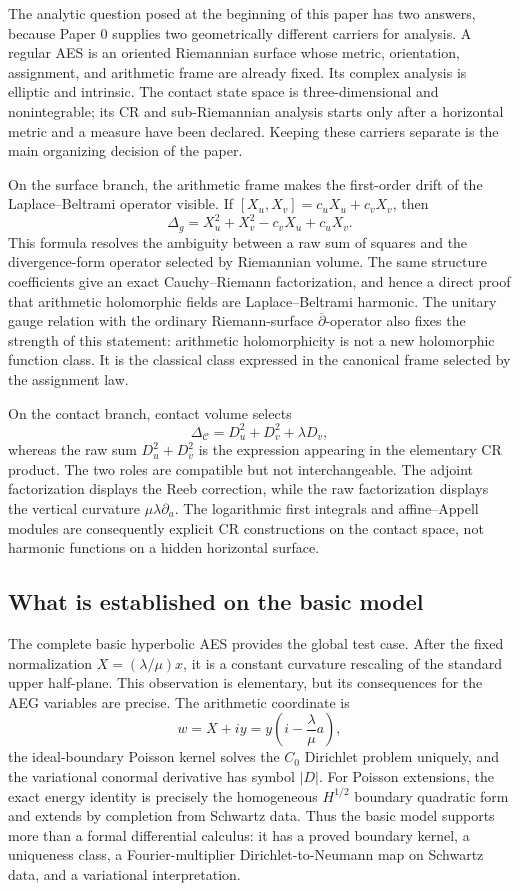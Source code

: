 The analytic question posed at the beginning of this paper has two answers, because
Paper 0 supplies two geometrically different carriers for analysis.  A regular AES
is an oriented Riemannian surface whose metric, orientation, assignment, and
arithmetic frame are already fixed.  Its complex analysis is elliptic and intrinsic.
The contact state space is three-dimensional and nonintegrable; its CR and
sub-Riemannian analysis starts only after a horizontal metric and a measure have
been declared.  Keeping these carriers separate is the main organizing decision of
the paper.

On the surface branch, the arithmetic frame makes the first-order drift of the
Laplace--Beltrami operator visible.  If
$[X_u,X_v]=c_uX_u+c_vX_v$, then
\[
 \Delta_g=X_u^2+X_v^2-c_vX_u+c_uX_v.
\]
This formula resolves the ambiguity between a raw sum of squares and the
divergence-form operator selected by Riemannian volume.  The same structure
coefficients give an exact Cauchy--Riemann factorization, and hence a direct proof
that arithmetic holomorphic fields are Laplace--Beltrami harmonic.  The unitary
gauge relation with the ordinary Riemann-surface $\overline\partial$-operator also
fixes the strength of this statement: arithmetic holomorphicity is not a new
holomorphic function class.  It is the classical class expressed in the canonical
frame selected by the assignment law.

On the contact branch, contact volume selects
\[
 \Delta_{\mathcal C}=D_u^2+D_v^2+\lambda D_v,
\]
whereas the raw sum $D_u^2+D_v^2$ is the expression appearing in the elementary
CR product.  The two roles are compatible but not interchangeable.  The adjoint
factorization displays the Reeb correction, while the raw factorization displays
the vertical curvature $\mu\lambda\partial_a$.  The logarithmic first integrals
and affine--Appell modules are consequently explicit CR constructions on the
contact space, not harmonic functions on a hidden horizontal surface.

\subsection{What is established on the basic model}

The complete basic hyperbolic AES provides the global test case.  After the fixed
normalization $X=(\lambda/\mu)x$, it is a constant curvature rescaling of the
standard upper half-plane.  This observation is elementary, but its consequences
for the AEG variables are precise.  The arithmetic coordinate is
\[
 w=X+iy=y\left(i-\frac{\lambda}{\mu}a\right),
\]
the ideal-boundary Poisson kernel solves the $C_0$ Dirichlet problem uniquely, and
the variational conormal derivative has symbol $|D|$.  For Poisson extensions, the
exact energy identity is precisely the homogeneous $H^{1/2}$ boundary quadratic
form and extends by completion from Schwartz data.  Thus the basic model supports
more than a formal differential calculus: it has a proved boundary kernel, a
uniqueness class, a Fourier-multiplier Dirichlet-to-Neumann map on Schwartz data,
and a variational interpretation.


